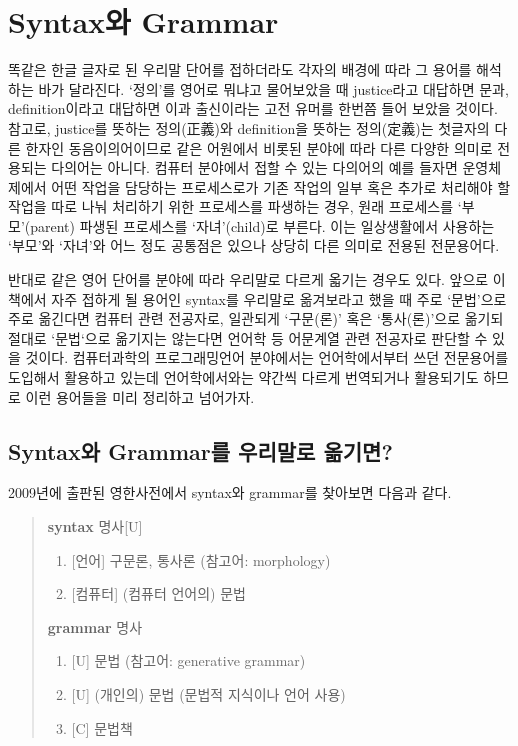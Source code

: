 
\chapter{Syntax와 Grammar}
\label{chap:SyntaxGrammar}
똑같은 한글 글자로 된 우리말 단어를 접하더라도 각자의 배경에 따라
그 용어를 해석하는 바가 달라진다. `정의'를 영어로 뭐냐고 물어보았을 때
justice라고 대답하면 문과, definition이라고 대답하면 이과 출신이라는
고전 유머를 한번쯤 들어 보았을 것이다. 참고로,
justice를 뜻하는 정의(正義)와 definition을 뜻하는 정의(定義)는
첫글자의 다른 한자인 동음이의어이므로 같은 어원에서 비롯된
분야에 따라 다른 다양한 의미로 전용되는 다의어는 아니다.
컴퓨터 분야에서 접할 수 있는 다의어의 예를 들자면 운영체제에서
어떤 작업을 담당하는 프로세스로가 기존 작업의 일부 혹은 추가로
처리해야 할 작업을 따로 나눠 처리하기 위한 프로세스를 파생하는 경우,
원래 프로세스를 `부모'(parent) 파생된 프로세스를 `자녀'(child)로 부른다.
이는 일상생활에서 사용하는 `부모'와 `자녀'와 어느 정도 공통점은 있으나
상당히 다른 의미로 전용된 전문용어다.

반대로 같은 영어 단어를 분야에 따라 우리말로 다르게 옯기는 경우도 있다.
앞으로 이 책에서 자주 접하게 될 용어인 syntax를 우리말로 옮겨보라고
했을 때 주로 `문법'으로 주로 옮긴다면 컴퓨터 관련 전공자로,
일관되게 `구문(론)' 혹은 `통사(론)'으로 옮기되 절대로 `문법`으로
옮기지는 않는다면 언어학 등 어문계열 관련 전공자로 판단할 수 있을 것이다.
컴퓨터과학의 프로그래밍언어 분야에서는 언어학에서부터 쓰던 전문용어를
도입해서 활용하고 있는데 언어학에서와는 약간씩 다르게 번역되거나
활용되기도 하므로 이런 용어들을 미리 정리하고 넘어가자.


\section{Syntax와 Grammar를 우리말로 옮기면?}

2009년에 출판된 영한사전\cite{OxEKdict}에서 syntax와 grammar를 찾아보면 다음과 같다.
\begin{quote}
    \textbf{syntax} 명사[U] \vspace{-1ex}
    \begin{enumerate}\tightlist
    \item{} [언어] 구문론, 통사론 (참고어: morphology)
    \item{} [컴퓨터] (컴퓨터 언어의) 문법
    \end{enumerate}
    \textbf{grammar} 명사 \vspace{-1ex}
    \begin{enumerate}\tightlist
    \item{} [U] 문법 (참고어: generative grammar)
    \item{} [U] (개인의) 문법 (문법적 지식이나 언어 사용)
    \item{} [C] 문법책
    \end{enumerate}
\end{quote}

